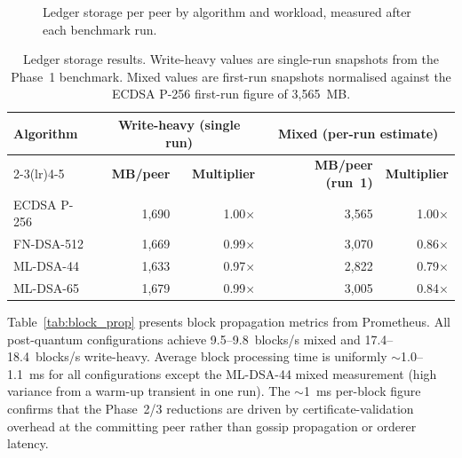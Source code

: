 \documentclass{ieeetj}
\begin{document}
\begin{figure}[ht]
\centering

\caption{Ledger storage per peer by algorithm and workload, measured after each benchmark run.}
\label{fig:storage}
\end{figure}

\begin{table}[ht]
\centering
\caption{Ledger storage results. Write-heavy values are single-run snapshots from
the Phase~1 benchmark. Mixed values are first-run snapshots normalised against the
ECDSA P-256 first-run figure of 3{,}565~MB.}
\label{tab:storage_results}
\begin{tabular}{@{}lrrrr@{}}
\toprule
\textbf{Algorithm} &
\multicolumn{2}{c}{\textbf{Write-heavy (single run)}} &
\multicolumn{2}{c}{\textbf{Mixed (per-run estimate)}} \\
\cmidrule(lr){2-3}\cmidrule(lr){4-5}
& \textbf{MB/peer} & \textbf{Multiplier} &
  \textbf{MB/peer (run~1)} & \textbf{Multiplier} \\
\midrule
ECDSA P-256 & 1,690 & 1.00$\times$ & 3,565 & 1.00$\times$ \\
FN-DSA-512  & 1,669 & 0.99$\times$ & 3,070 & 0.86$\times$ \\
ML-DSA-44   & 1,633 & 0.97$\times$ & 2,822 & 0.79$\times$ \\
ML-DSA-65   & 1,679 & 0.99$\times$ & 3,005 & 0.84$\times$ \\
\bottomrule
\end{tabular}
\end{table}

Table~\ref{tab:block_prop} presents block propagation metrics from Prometheus.
All post-quantum configurations achieve 9.5--9.8~blocks/s mixed and
17.4--18.4~blocks/s write-heavy. Average block processing time is uniformly
$\sim$1.0--1.1~ms for all configurations except the ML-DSA-44 mixed measurement
(high variance from a warm-up transient in one run). The $\sim$1~ms per-block
figure confirms that the Phase~2/3 reductions are driven by certificate-validation
overhead at the committing peer rather than gossip propagation or orderer latency.
\end{document}

